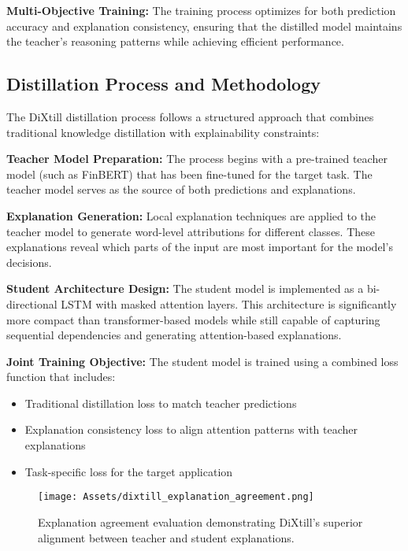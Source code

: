 \textbf{Multi-Objective Training:} The training process optimizes for both prediction accuracy and explanation consistency, ensuring that the distilled model maintains the teacher's reasoning patterns while achieving efficient performance.

\subsection{Distillation Process and Methodology}

The DiXtill distillation process follows a structured approach that combines traditional knowledge distillation with explainability constraints:

\textbf{Teacher Model Preparation:} The process begins with a pre-trained teacher model (such as FinBERT) that has been fine-tuned for the target task. The teacher model serves as the source of both predictions and explanations.


\textbf{Explanation Generation:} Local explanation techniques are applied to the teacher model to generate word-level attributions for different classes. These explanations reveal which parts of the input are most important for the model's decisions.

\textbf{Student Architecture Design:} The student model is implemented as a bi-directional LSTM with masked attention layers. This architecture is significantly more compact than transformer-based models while still capable of capturing sequential dependencies and generating attention-based explanations.

\textbf{Joint Training Objective:} The student model is trained using a combined loss function that includes:
\begin{itemize}
    \item Traditional distillation loss to match teacher predictions
    \item Explanation consistency loss to align attention patterns with teacher explanations
    \item Task-specific loss for the target application
\end{itemize}

\begin{figure}[H]
    \centering
    \texttt{[image: Assets/dixtill\_explanation\_agreement.png]}
    \caption{Explanation agreement evaluation demonstrating DiXtill's superior alignment between teacher and student explanations.}
    \label{fig:dixtill_explanation_agreement}
\end{figure}

